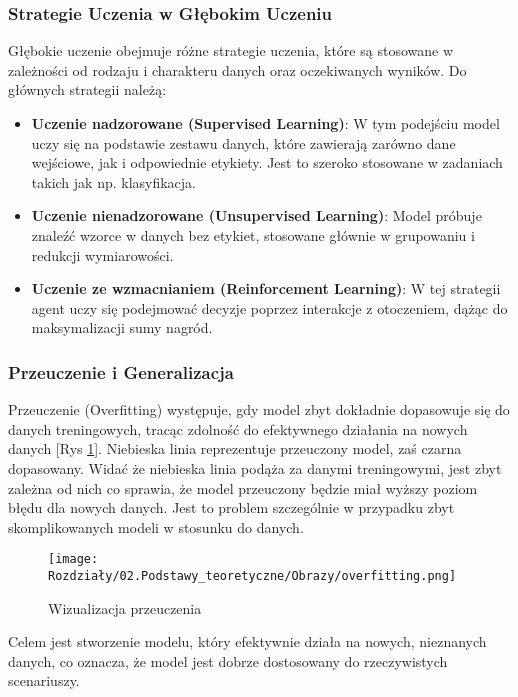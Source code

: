 \subsubsection*{Strategie Uczenia w Głębokim Uczeniu}
Głębokie uczenie obejmuje różne strategie uczenia, które są stosowane w zależności od rodzaju i charakteru danych oraz oczekiwanych wyników. Do głównych strategii należą:

\begin{itemize}
    \item \textbf{Uczenie nadzorowane (Supervised Learning)}: W tym podejściu model uczy się na podstawie zestawu danych, które zawierają zarówno dane wejściowe, jak i odpowiednie etykiety. Jest to szeroko stosowane w zadaniach takich jak np. klasyfikacja.
    \item \textbf{Uczenie nienadzorowane (Unsupervised Learning)}: Model próbuje znaleźć wzorce w danych bez etykiet, stosowane głównie w grupowaniu i redukcji wymiarowości.
    \item \textbf{Uczenie ze wzmacnianiem (Reinforcement Learning)}: W tej strategii agent uczy się podejmować decyzje poprzez interakcje z otoczeniem, dążąc do maksymalizacji sumy nagród.
\end{itemize}


\subsubsection*{Przeuczenie i Generalizacja}

Przeuczenie (Overfitting) występuje, gdy model zbyt dokładnie dopasowuje się do danych treningowych, tracąc zdolność do efektywnego działania na nowych danych [Rys \ref{fig:image17}]. Niebieska linia reprezentuje przeuczony model, zaś czarna dopasowany. Widać że niebieska linia podąża za danymi treningowymi, jest zbyt zależna od nich co sprawia, że model przeuczony będzie miał wyższy poziom błędu dla nowych danych. Jest to problem szczególnie w przypadku zbyt skomplikowanych modeli w stosunku do danych.
\begin{figure}[h]
    \centering
    \texttt{[image: Rozdziały/02.Podstawy\_teoretyczne/Obrazy/overfitting.png]}
    \caption{Wizualizacja przeuczenia}
    \label{fig:image17}
\end{figure}

Celem jest stworzenie modelu, który efektywnie działa na nowych, nieznanych danych, co oznacza, że model jest dobrze dostosowany do rzeczywistych scenariuszy.

